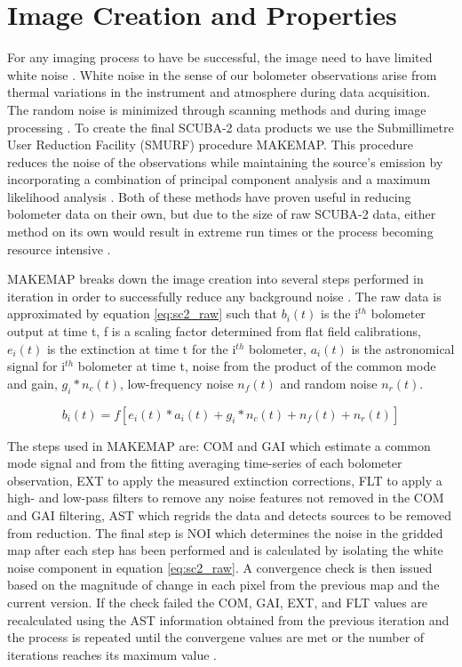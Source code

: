 \section{Image Creation and Properties}

For any imaging process to have be successful, the image need to have limited white noise \citep{chapin2013}.  White noise in the sense of our bolometer observations arise from thermal variations in the instrument and atmosphere during data acquisition. The random noise is minimized through scanning methods and during image processing \citep{chapin2013}.  To create the final SCUBA-2 data products we use the Submillimetre User Reduction Facility (SMURF) procedure MAKEMAP.  This procedure reduces the noise of the observations while maintaining the source's emission by incorporating a combination of principal component analysis and a maximum likelihood analysis \citep{chapin2013}.  Both of these methods have proven useful in reducing bolometer data on their own, but due to the size of raw SCUBA-2 data, either method on its own would result in extreme run times or the process becoming resource intensive \citep{chapin2013}.


MAKEMAP breaks down the image creation into several steps performed in iteration in order to successfully reduce any background noise \citep{chapin2013}.  The raw data is approximated by equation \ref{eq:sc2_raw} such that $b_i(t)$ is the i$^{th}$ bolometer output at time t, f is a scaling factor determined from flat field calibrations, $e_i(t)$ is the extinction at time t for the i$^{th}$ bolometer, $a_i(t)$ is the astronomical signal for i$^{th}$ bolometer at time t, noise from the product of the common mode and gain, $g_i*n_c(t)$, low-frequency noise $n_f(t)$ and random noise $n_r(t)$\citep{chapin2013}.

\begin{equation}\label{eq:sc2_raw}
  b_i(t) = f \left[ e_i(t)*a_i(t) + g_i*n_c(t)+n_f(t)+n_r(t)\right]
\end{equation}

The steps used in MAKEMAP are:  COM and GAI which estimate a common mode signal and from the fitting averaging time-series of each bolometer observation, EXT to apply the measured extinction corrections, FLT to apply a high- and low-pass filters to remove any noise features not removed in the COM and GAI filtering, AST which regrids the data and detects sources to be removed from reduction.  The final step is NOI which determines the noise in the gridded map after each step has been performed and is calculated by isolating the white noise component in equation \ref{eq:sc2_raw}.  A convergence check is then issued based on the magnitude of change in each pixel from the previous map and the current version.  If the check failed the COM, GAI, EXT, and FLT values are recalculated using the AST information obtained from the previous iteration and the process is repeated until the convergene values are met or the number of iterations reaches its maximum value \citep{chapin2013}.

